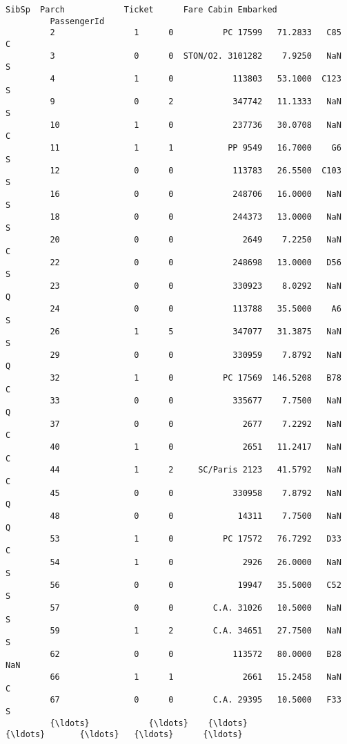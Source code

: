 \documentclass[11pt]{article}
\begin{document}
\begin{Verbatim}[commandchars=\\\{\}]
                      SibSp  Parch            Ticket      Fare Cabin Embarked  
         PassengerId                                                           
         2                1      0          PC 17599   71.2833   C85        C  
         3                0      0  STON/O2. 3101282    7.9250   NaN        S  
         4                1      0            113803   53.1000  C123        S  
         9                0      2            347742   11.1333   NaN        S  
         10               1      0            237736   30.0708   NaN        C  
         11               1      1           PP 9549   16.7000    G6        S  
         12               0      0            113783   26.5500  C103        S  
         16               0      0            248706   16.0000   NaN        S  
         18               0      0            244373   13.0000   NaN        S  
         20               0      0              2649    7.2250   NaN        C  
         22               0      0            248698   13.0000   D56        S  
         23               0      0            330923    8.0292   NaN        Q  
         24               0      0            113788   35.5000    A6        S  
         26               1      5            347077   31.3875   NaN        S  
         29               0      0            330959    7.8792   NaN        Q  
         32               1      0          PC 17569  146.5208   B78        C  
         33               0      0            335677    7.7500   NaN        Q  
         37               0      0              2677    7.2292   NaN        C  
         40               1      0              2651   11.2417   NaN        C  
         44               1      2     SC/Paris 2123   41.5792   NaN        C  
         45               0      0            330958    7.8792   NaN        Q  
         48               0      0             14311    7.7500   NaN        Q  
         53               1      0          PC 17572   76.7292   D33        C  
         54               1      0              2926   26.0000   NaN        S  
         56               0      0             19947   35.5000   C52        S  
         57               0      0        C.A. 31026   10.5000   NaN        S  
         59               1      2        C.A. 34651   27.7500   NaN        S  
         62               0      0            113572   80.0000   B28      NaN  
         66               1      1              2661   15.2458   NaN        C  
         67               0      0        C.A. 29395   10.5000   F33        S  
         {\ldots}            {\ldots}    {\ldots}               {\ldots}       {\ldots}   {\ldots}      {\ldots}  

\end{Verbatim}
\end{document}
